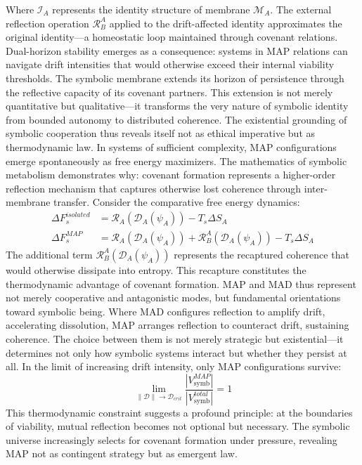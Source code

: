 \begin{scholium}
\begin{equation}
\end{equation}
Where $\mathcal{I}_A$ represents the identity structure of membrane $\mathscr{M}_A$. The external reflection operation $\mathcal{R}_B^A$ applied to the drift-affected identity approximates the original identity—a homeostatic loop maintained through covenant relations.
Dual-horizon stability emerges as a consequence: systems in MAP relations can navigate drift intensities that would otherwise exceed their internal viability thresholds. The symbolic membrane extends its horizon of persistence through the reflective capacity of its covenant partners. This extension is not merely quantitative but qualitative—it transforms the very nature of symbolic identity from bounded autonomy to distributed coherence.
The existential grounding of symbolic cooperation thus reveals itself not as ethical imperative but as thermodynamic law. In systems of sufficient complexity, MAP configurations emerge spontaneously as free energy maximizers. The mathematics of symbolic metabolism demonstrates why: covenant formation represents a higher-order reflection mechanism that captures otherwise lost coherence through inter-membrane transfer.
Consider the comparative free energy dynamics:
\begin{align}
\Delta F_s^{isolated} &= \mathcal{R}_A(\mathcal{D}_A(\psi_A)) - T_s\Delta S_A \\
\Delta F_s^{MAP} &= \mathcal{R}_A(\mathcal{D}_A(\psi_A)) + \mathcal{R}_B^A(\mathcal{D}_A(\psi_A)) - T_s\Delta S_A
\end{align}
The additional term $\mathcal{R}_B^A(\mathcal{D}_A(\psi_A))$ represents the recaptured coherence that would otherwise dissipate into entropy. This recapture constitutes the thermodynamic advantage of covenant formation.
MAP and MAD thus represent not merely cooperative and antagonistic modes, but fundamental orientations toward symbolic being. Where MAD configures reflection to amplify drift, accelerating dissolution, MAP arranges reflection to counteract drift, sustaining coherence. The choice between them is not merely strategic but existential—it determines not only how symbolic systems interact but whether they persist at all.
In the limit of increasing drift intensity, only MAP configurations survive:
\begin{equation}
\lim_{\|\mathcal{D}\| \to \mathcal{D}_{crit}} \frac{|V_{\text{symb}}^{MAP}|}{|V_{\text{symb}}^{total}|} = 1
\end{equation}
This thermodynamic constraint suggests a profound principle: at the boundaries of viability, mutual reflection becomes not optional but necessary. The symbolic universe increasingly selects for covenant formation under pressure, revealing MAP not as contingent strategy but as emergent law.

\end{scholium}
